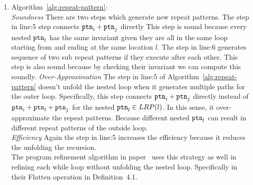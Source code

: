 \begin{enumerate}
  \item
Algorithm~\ref{alg:repeat-pattern}:
\\
\emph{Soundness}
There are two steps which generate new repeat patterns.
The step in line:5 step connects  $\mathtt{ptn}_i +\mathtt{ptn}_j$ directly
This step is sound because every nested $\mathtt{ptn}_l$
has the same invariant given they are all in the same loop starting from and ending at the same location $l$.
The step in line:6 generates sequence of two sub repeat patterns if they execute after each other.
This step is also sound because by checking their invariant we can compute this soundly.
\emph{Over-Approximation}
The step in line:5 of Algorithm~\ref{alg:repeat-pattern} doesn't unfold the nested loop when it generates multiple paths for the outer loop.
Specifically, this step connects  $\mathtt{ptn}_i +\mathtt{ptn}_j$ directly
instead of $\mathtt{ptn}_i + \mathtt{ptn}_l + \mathtt{ptn}_j$ for the nested $\mathtt{ptn}_l \in LRP(l)$. 
In this sense, it over-approximate the repeat patterns.
Because different nested $\mathtt{ptn}_l$ can result in different repeat patterns of the outside loop.
\\
\emph{Efficiency}
Again the step in line:5 increases the efficiency because it reduces the unfolding the recursion.
\\
The program refinement algorithm in paper~\cite{GulwaniJK09} uses this strategy as well in refining each while loop without unfolding the nested loop.
Specifically in their Flatten operation in Definition~4.1.

\end{enumerate}
